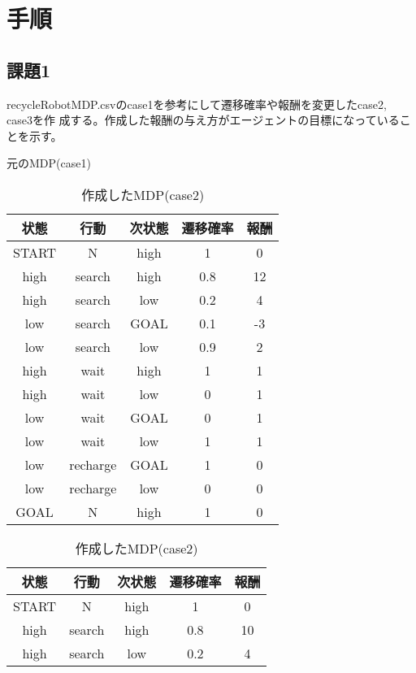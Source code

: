 \section{手順}
\subsection{課題1}
recycleRobotMDP.csvのcase1を参考にして遷移確率や報酬を変更したcase2, case3を作
成する。作成した報酬の与え方がエージェントの目標になっていることを示す。
\begin{table}[hbtp]
  \begin{minipage}[t]{\hsize}
  \centering
  \caption{元のMDP(case1)}
  \label{table:1}
    \begin{tabular}{|c|c|c|c|c|}
      \hline
      状態 & 行動 & 次状態 & 遷移確率 & 報酬\\
      \hline
      \hline
      START & N & high & 1 & 0 \\
      \hline
      high & search & high & 0.8 & 12 \\
      high & search & low & 0.2 & 4 \\
      \hline
      low & search & GOAL & 0.1 & -3 \\
      low & search & low & 0.9 & 2 \\
      \hline
      high & wait & high & 1 & 1 \\
      high & wait & low & 0 & 1 \\
      \hline
      low & wait & GOAL & 0 & 1 \\
      low & wait & low & 1 & 1 \\
      \hline
      low & recharge & GOAL & 1 & 0 \\
      low & recharge & low & 0 & 0 \\
      \hline
      GOAL & N & high & 1 & 0 \\
      \hline
    \end{tabular}
  \end{minipage}
  \begin{minipage}[t]{0.45\hsize}
    \centering
    \caption{作成したMDP(case2)}
    \label{table:2}
      \begin{tabular}{|c|c|c|c|c|}
        \hline
        状態 & 行動 & 次状態 & 遷移確率 & 報酬\\
        \hline
        \hline
        START & N & high & 1 & 0 \\
        \hline
        high & search & high & 0.8 & 10 \\
        high & search & low & 0.2 & 4 \\

\end{tabular}
\end{minipage}
\end{table}
